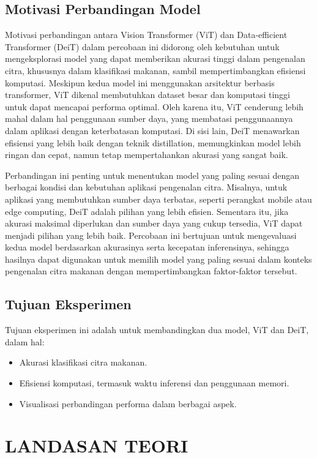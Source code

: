 \documentclass[11pt,a4paper]{article}
\begin{document}
\subsection{Motivasi Perbandingan Model}
Motivasi perbandingan antara Vision Transformer (ViT) dan Data-efficient Transformer (DeiT) dalam percobaan ini didorong oleh kebutuhan untuk mengeksplorasi model yang dapat memberikan akurasi tinggi dalam pengenalan citra, khususnya dalam klasifikasi makanan, sambil mempertimbangkan efisiensi komputasi. Meskipun kedua model ini menggunakan arsitektur berbasis transformer, ViT dikenal membutuhkan dataset besar dan komputasi tinggi untuk dapat mencapai performa optimal. Oleh karena itu, ViT cenderung lebih mahal dalam hal penggunaan sumber daya, yang membatasi penggunaannya dalam aplikasi dengan keterbatasan komputasi. Di sisi lain, DeiT menawarkan efisiensi yang lebih baik dengan teknik distillation, memungkinkan model lebih ringan dan cepat, namun tetap mempertahankan akurasi yang sangat baik.

Perbandingan ini penting untuk menentukan model yang paling sesuai dengan berbagai kondisi dan kebutuhan aplikasi pengenalan citra. Misalnya, untuk aplikasi yang membutuhkan sumber daya terbatas, seperti perangkat mobile atau edge computing, DeiT adalah pilihan yang lebih efisien. Sementara itu, jika akurasi maksimal diperlukan dan sumber daya yang cukup tersedia, ViT dapat menjadi pilihan yang lebih baik. Percobaan ini bertujuan untuk mengevaluasi kedua model berdasarkan akurasinya serta kecepatan inferensinya, sehingga hasilnya dapat digunakan untuk memilih model yang paling sesuai dalam konteks pengenalan citra makanan dengan mempertimbangkan faktor-faktor tersebut.

\subsection{Tujuan Eksperimen}
Tujuan eksperimen ini adalah untuk membandingkan dua model, ViT dan DeiT, dalam hal:
\begin{itemize}
    \item Akurasi klasifikasi citra makanan.
    \item Efisiensi komputasi, termasuk waktu inferensi dan penggunaan memori.
    \item Visualisasi perbandingan performa dalam berbagai aspek.
\end{itemize}

\section{LANDASAN TEORI}
\end{document}
